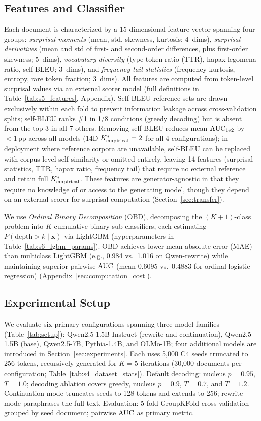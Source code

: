 \subsection{Features and Classifier}
\label{sec:features}

Each document is characterized by a 15-dimensional feature vector spanning four groups: \emph{surprisal moments} (mean, std, skewness, kurtosis; 4~dims), \emph{surprisal derivatives} (mean and std of first- and second-order differences, plus first-order skewness; 5~dims), \emph{vocabulary diversity} (type-token ratio (TTR), hapax legomena ratio, self-BLEU; 3~dims), and \emph{frequency tail statistics} (frequency kurtosis, entropy, rare token fraction; 3~dims).
All features are computed from token-level surprisal values via an external scorer model (full definitions in Table~\ref{tab:s5_features}, Appendix).
Self-BLEU reference sets are drawn exclusively within each fold to prevent information leakage across cross-validation splits; self-BLEU ranks \#1 in 1/8 conditions (greedy decoding) but is absent from the top-3 in all 7 others.
Removing self-BLEU reduces mean $\text{AUC}_{1v2}$ by $< 1$\,pp across all models (14D ${K^*_{\text{empirical}}} = 2$ for all 4 configurations); in deployment where reference corpora are unavailable, self-BLEU can be replaced with corpus-level self-similarity or omitted entirely, leaving 14 features (surprisal statistics, TTR, hapax ratio, frequency tail) that require no external reference and retain full ${K^*_{\text{empirical}}}$.
These features are generator-agnostic in that they require no knowledge of or access to the generating model, though they depend on an external scorer for surprisal computation (Section~\ref{sec:transfer}).

We use \emph{Ordinal Binary Decomposition} (OBD), decomposing the $(K{+}1)$-class problem into $K$ cumulative binary sub-classifiers, each estimating $P(\text{depth} > k \mid \mathbf{x})$ via LightGBM (hyperparameters in Table~\ref{tab:s6_lgbm_params}).
OBD achieves lower mean absolute error (MAE) than multiclass LightGBM (e.g., 0.984 vs.\ 1.016 on Qwen-rewrite) while maintaining superior pairwise $\text{AUC}$ (mean 0.6095 vs.\ 0.4883 for ordinal logistic regression) (Appendix~\ref{sec:computation_cost}).

\subsection{Experimental Setup}
\label{sec:experimental_setup}

We evaluate six primary configurations spanning three model families (Table~\ref{tab:setup}): Qwen2.5-1.5B-Instruct (rewrite and continuation), Qwen2.5-1.5B (base), Qwen2.5-7B, Pythia-1.4B, and OLMo-1B; four additional models are introduced in Section~\ref{sec:experiments}.
Each uses 5{,}000 C4 seeds truncated to 256 tokens, recursively generated for $K{=}5$ iterations (30{,}000 documents per configuration; Table~\ref{tab:s4_dataset_stats}).
Default decoding: nucleus $p{=}0.95$, $T{=}1.0$; decoding ablation covers greedy, nucleus $p{=}0.9$, $T{=}0.7$, and $T{=}1.2$.
Continuation mode truncates seeds to 128 tokens and extends to 256; rewrite mode paraphrases the full text.
Evaluation: 5-fold GroupKFold cross-validation grouped by seed document; pairwise $\text{AUC}$ as primary metric.

